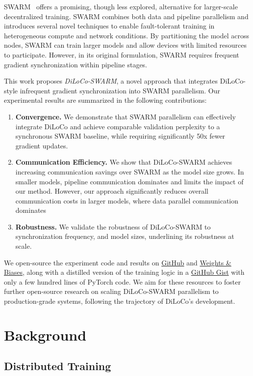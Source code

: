 \documentclass{article}
\newcommand{\github}{\href{https://github.com/mikasenghaas/diloco-swarm}{GitHub}}
\newcommand{\wandb}{\href{https://wandb.ai/mikasenghaas/diloco-swarm}{Weights \& Biases}}
\newcommand{\gist}{\href{https://gist.github.com/mikasenghaas/5fa1aa77ea69f187f531a5889983c249}{GitHub Gist}}
\begin{document}
SWARM~\cite{ryabinin2023swarm} offers a promising, though less explored, alternative for larger-scale decentralized training. SWARM combines both data and pipeline parallelism and introduces several novel techniques to enable fault-tolerant training in heterogeneous compute and network conditions. By partitioning the model across nodes, SWARM can train larger models and allow devices with limited resources to participate. However, in its original formulation, SWARM requires frequent gradient synchronization within pipeline stages. 

This work proposes \textit{DiLoCo-SWARM}, a novel approach that integrates DiLoCo-style infrequent gradient synchronization into SWARM parallelism. Our experimental results are summarized in the following contributions:

\begin{enumerate}
  \item \textbf{Convergence.} We demonstrate that SWARM parallelism can effectively integrate DiLoCo and achieve comparable validation perplexity to a synchronous SWARM baseline, while requiring significantly 50x fewer gradient updates.
  \item \textbf{Communication Efficiency.} We show that DiLoCo-SWARM achieves increasing communication savings over SWARM as the model size grows. In smaller models, pipeline communication dominates and limits the impact of our method. However, our approach significantly reduces overall communication costs in larger models, where data parallel communication dominates
  \item \textbf{Robustness.} We validate the robustness of DiLoCo-SWARM to synchronization frequency, and model sizes, underlining its robustness at scale.
\end{enumerate}

We open-source the experiment code and results on \github{} and \wandb{}, along with a distilled version of the training logic in a \gist{} with only a few hundred lines of PyTorch code. We aim for these resources to foster further open-source research on scaling DiLoCo-SWARM parallelism to production-grade systems, following the trajectory of DiLoCo's development.

\section{Background}

\subsection{Distributed Training}
\end{document}

